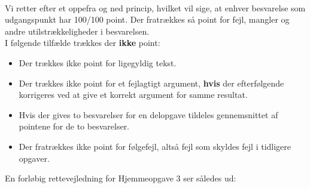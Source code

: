 \documentclass{article}
\begin{document}
\vspace*{0.2cm}\\
Vi retter efter et oppefra og ned princip, hvilket vil sige, at enhver besvarelse som udgangspunkt har 100/100 point. Der fratrækkes så point for fejl, mangler og andre utilstrækkeligheder i besvarelsen.
\vspace*{0.2cm}\\
I følgende tilfælde trækkes der \textbf{ikke} point:
\begin{itemize}
	\item Der trækkes ikke point for ligegyldig tekst.
	\item Der trækkes ikke point for et fejlagtigt argument, \textbf{hvis} der efterfølgende korrigeres ved at give et korrekt argument for samme resultat. 
	\item Hvis der gives to besvarelser for en delopgave tildeles gennemsnittet af pointene for de to besvarelser.
	\item Der fratrækkes ikke point for følgefejl, altså fejl som skyldes fejl i tidligere opgaver.
\end{itemize}

En forløbig rettevejledning for Hjemmeopgave 3 ser således ud:
\end{document}
